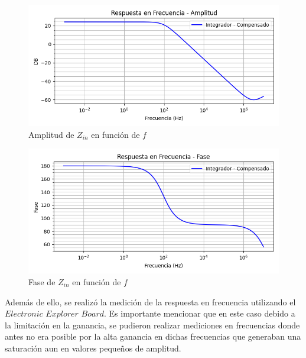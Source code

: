 \begin{figure}[H]
    \centering 
    \includegraphics [scale=1] {../Ejercicio3-CircuitoIntegradoresyDerivadores/Imagenes/diagrama-bode-integrador-simulado-compensado-amplitud.png} 
    \caption{Amplitud de $Z_{in}$ en función de $f$}
    \label{fig:emptyPlotTool}
\end{figure}

\begin{figure}[H]
    \centering 
    \includegraphics [scale=1] {../Ejercicio3-CircuitoIntegradoresyDerivadores/Imagenes/diagrama-bode-integrador-simulado-compensado-fase.png} 
    \caption{Fase de $Z_{in}$ en función de $f$ }
    \label{fig:emptyPlotTool}
\end{figure}

Además de ello, se realizó la medición de la respuesta en frecuencia utilizando el $Electronic$ $Explorer$ $Board$. Es importante mencionar
que en este caso debido a la limitación en la ganancia, se pudieron realizar mediciones en frecuencias donde antes no era posible por la alta ganancia
en dichas frecuencias que generaban una saturación aun en valores pequeños de amplitud.

